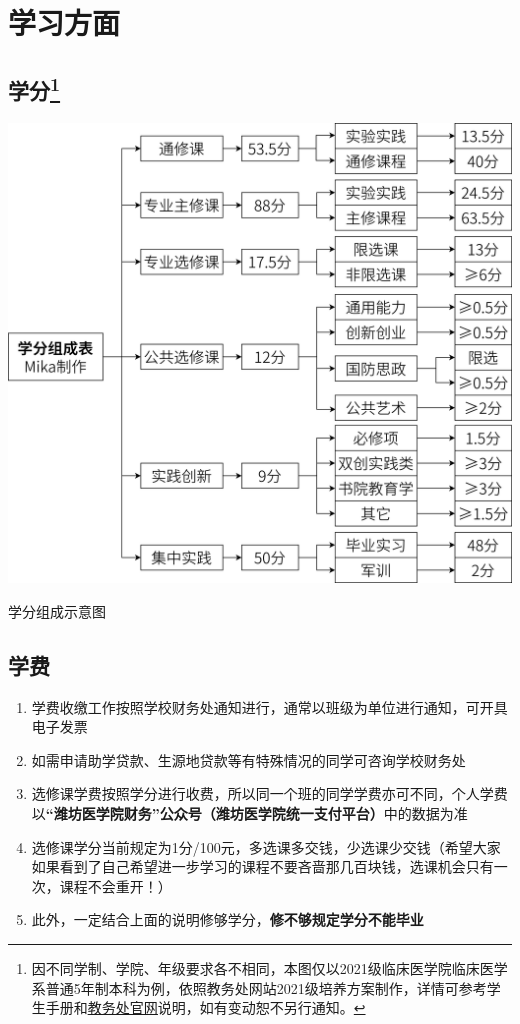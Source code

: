 \chapter[学习方面]{学习方面}
\section[学分]{学分\footnote{因不同学制、学院、年级要求各不相同，本图仅以2021级临床医学院临床医学系普通5年制本科为例，依照教务处网站2021级培养方案制作，详情可参考学生手册和\href{https://jwch.wfmc.edu.cn/2022/0916/c5343a107934/page.htm}{\uline{教务处官网}}说明，如有变动恕不另行通知。}\vspace{-1em}}
\begin{table}[ht]
    \centering
    \includegraphics[width=\textwidth]{学分.jpg}
    \vspace{-1em}
    \caption[学分组成示意图]{学分组成示意图}
    \label{score}
\end{table}

\newpage
\section[学费]{学费}
\begin{enumerate}
    \item 学费收缴工作按照学校财务处通知进行，通常以班级为单位进行通知，可开具电子发票
    \item 如需申请助学贷款、生源地贷款等有特殊情况的同学可咨询学校财务处
    \item 选修课学费按照学分进行收费，所以同一个班的同学学费亦可不同，个人学费以\textbf{“潍坊医学院财务”公众号（潍坊医学院统一支付平台）}中的数据为准
    \item 选修课学分当前规定为1分/100元，多选课多交钱，少选课少交钱（希望大家如果看到了自己希望进一步学习的课程不要吝啬那几百块钱，选课机会只有一次，课程不会重开！）
    \item 此外，一定结合上面的说明修够学分，\textbf{修不够规定学分不能毕业}
\end{enumerate}


